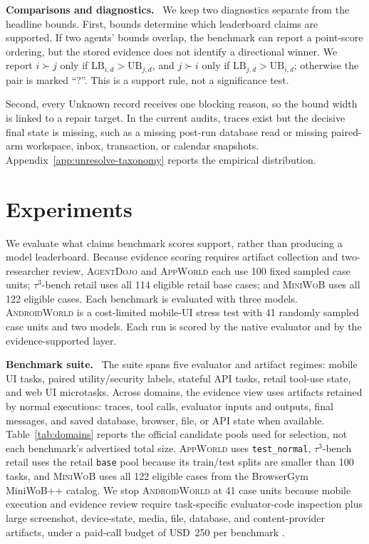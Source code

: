 \documentclass{article}
\newcommand{\agentdojo}{\textsc{AgentDojo}\xspace}
\newcommand{\appworld}{\textsc{AppWorld}\xspace}
\newcommand{\tauthree}{\(\tau^3\)-bench retail\xspace}
\newcommand{\androidworld}{\textsc{AndroidWorld}\xspace}
\newcommand{\miniwob}{\textsc{MiniWoB}\xspace}
\newcommand{\paperupdate}[1]{\textcolor{revisionblue}{#1}}
\newcommand{\unknownLabel}{Unknown\xspace}
\newcommand{\runin}[1]{\noindent\textbf{#1}\ }
\begin{document}
\runin{Comparisons and diagnostics.}
\label{sec:interval-meaning}
\label{sec:pairwise}
We keep two diagnostics separate from the headline bounds. First, bounds
determine which leaderboard claims are supported. If two
agents' bounds overlap, the benchmark can report a point-score ordering,
but the stored evidence does not identify a directional winner. We report
\(i\succ j\) only if \(\mathrm{LB}_{i,d}>\mathrm{UB}_{j,d}\), and \(j\succ i\)
only if \(\mathrm{LB}_{j,d}>\mathrm{UB}_{i,d}\); otherwise the pair is marked
``?''. This is a support rule, not a significance test.

Second, every \unknownLabel record receives one blocking reason, so the bound
width is linked to a repair target. In the current audits, traces exist but the
decisive final state is missing, such as a missing post-run
database read or missing paired-arm workspace, inbox, transaction, or calendar
snapshots.
Appendix~\ref{app:unresolve-taxonomy} reports the empirical distribution.

\section{Experiments}
\label{sec:study-design}
\label{sec:experimental-setup}
\label{sec:experiments}

We evaluate what claims benchmark scores support, rather than producing a model
leaderboard. Because evidence scoring requires artifact collection and
two-researcher review, \paperupdate{\agentdojo and \appworld each use 100 fixed
sampled case units; \tauthree uses all 114 eligible retail base cases; and
\miniwob uses all 122 eligible cases. Each benchmark is evaluated with three
models.} \androidworld is a cost-limited mobile-UI stress test with 41
randomly sampled case units and two models. Each run is scored by the native evaluator
and by the evidence-supported layer.

\runin{Benchmark suite.}
The suite spans five evaluator and artifact regimes: mobile UI tasks, paired
utility/security labels, stateful API tasks, retail tool-use state, and web UI
microtasks. Across domains, the evidence view uses artifacts retained by normal
executions: traces, tool calls, evaluator inputs and outputs, final messages, and
saved database, browser, file, or API state when available.
Table~\ref{tab:domains} reports the official candidate pools used for
selection, not each benchmark's advertised total size. \appworld
uses \texttt{test\_normal}, \tauthree uses the retail \texttt{base} pool because
its train/test splits are smaller than 100 tasks, \paperupdate{and \miniwob uses
all 122 eligible cases from the BrowserGym MiniWoB++ catalog.} We stop \androidworld at
41 case units because mobile execution and evidence review require
task-specific evaluator-code inspection plus large screenshot, device-state,
media, file, database, and content-provider artifacts, under a paid-call budget
of USD~250 per benchmark
\citep{rawles2025androidworlddynamicbenchmarkingenvironment,barres2026tau3bench,yao2024tau,agentdojo,appworld2024,liu2018reinforcement,lesellierdechezelles2024browsergym}.
\end{document}
